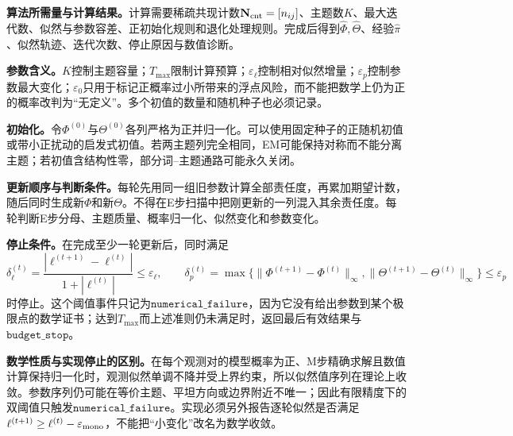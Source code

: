 \label{struct:V4-C06-CH19}
\label{struct:V4-C06-CH20}
\textbf{算法所需量与计算结果。}计算需要稀疏共现计数$\mathbf N_{\rm cnt}=[n_{ij}]$、主题数$K$、最大迭代数、似然与参数容差、正初始化规则和退化处理规则。完成后得到$\widehat\Phi,\widehat\Theta$、经验$\widehat\pi$、似然轨迹、迭代次数、停止原因与数值诊断。

\label{struct:V4-C06-CH21}
\textbf{参数含义。}$K$控制主题容量；$T_{\max}$限制计算预算；$\varepsilon_\ell$控制相对似然增量；$\varepsilon_p$控制参数最大变化；$\varepsilon_0$只用于标记正概率过小所带来的浮点风险，而不能把数学上仍为正的概率改判为“无定义”。多个初值的数量和随机种子也必须记录。

\label{struct:V4-C06-CH22}
\textbf{初始化。}令$\Phi^{(0)}$与$\Theta^{(0)}$各列严格为正并归一化。可以使用固定种子的正随机初值或带小正扰动的启发式初值。若两主题列完全相同，EM可能保持对称而不能分离主题；若初值含结构性零，部分词--主题通路可能永久关闭。

\label{struct:V4-C06-CH23}
\textbf{更新顺序与判断条件。}每轮先用同一组旧参数计算全部责任度，再累加期望计数，随后同时生成新$\Phi$和新$\Theta$。不得在E步扫描中把刚更新的一列混入其余责任度。每轮判断E步分母、主题质量、概率归一化、似然变化和参数变化。

\label{struct:V4-C06-CH24}
\textbf{停止条件。}在完成至少一轮更新后，同时满足
\[
\delta_\ell^{(t)}=
\frac{|\ell^{(t+1)}-\ell^{(t)}|}{1+|\ell^{(t)}|}
\le\varepsilon_\ell,
\qquad
\delta_p^{(t)}=\max\{\|\Phi^{(t+1)}-\Phi^{(t)}\|_\infty,
\|\Theta^{(t+1)}-\Theta^{(t)}\|_\infty\}\le\varepsilon_p
\]
时停止。这个阈值事件只记为$\mathtt{numerical\_failure}$，因为它没有给出参数到某个极限点的数学证书；达到$T_{\max}$而上述准则仍未满足时，返回最后有效结果与$\mathtt{budget\_stop}$。

\label{struct:V4-C06-CH25}
\textbf{数学性质与实现停止的区别。}在每个观测对的模型概率为正、M步精确求解且数值计算保持归一化时，观测似然单调不降并受上界约束，所以似然值序列在理论上收敛。参数序列仍可能在等价主题、平坦方向或边界附近不唯一；因此有限精度下的双阈值只触发$\mathtt{numerical\_failure}$。实现必须另外报告逐轮似然是否满足
$\ell^{(t+1)}\ge\ell^{(t)}-\varepsilon_{\rm mono}$，不能把“小变化”改名为数学收敛。

\begingroup
{}
